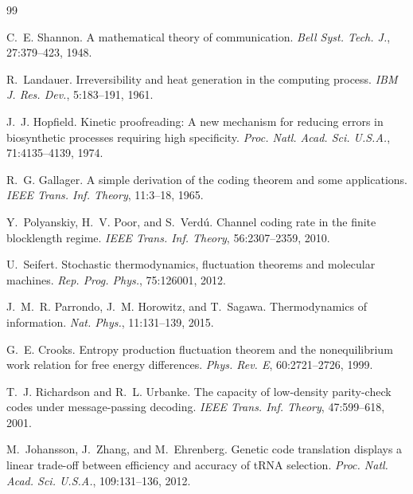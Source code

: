 \documentclass[11pt,twocolumn]{article}
\begin{document}
\begin{thebibliography}{99}

C.~E. Shannon.
\newblock A mathematical theory of communication.
\newblock \emph{Bell Syst. Tech. J.}, 27:379--423, 1948.

R.~Landauer.
\newblock Irreversibility and heat generation in the computing process.
\newblock \emph{IBM J. Res. Dev.}, 5:183--191, 1961.

J.~J. Hopfield.
\newblock Kinetic proofreading: A new mechanism for reducing errors in biosynthetic processes requiring high specificity.
\newblock \emph{Proc. Natl. Acad. Sci. U.S.A.}, 71:4135--4139, 1974.

R.~G. Gallager.
\newblock A simple derivation of the coding theorem and some applications.
\newblock \emph{IEEE Trans. Inf. Theory}, 11:3--18, 1965.

Y.~Polyanskiy, H.~V. Poor, and S.~Verd{\'u}.
\newblock Channel coding rate in the finite blocklength regime.
\newblock \emph{IEEE Trans. Inf. Theory}, 56:2307--2359, 2010.

U.~Seifert.
\newblock Stochastic thermodynamics, fluctuation theorems and molecular machines.
\newblock \emph{Rep. Prog. Phys.}, 75:126001, 2012.

J.~M.~R. Parrondo, J.~M. Horowitz, and T.~Sagawa.
\newblock Thermodynamics of information.
\newblock \emph{Nat. Phys.}, 11:131--139, 2015.

G.~E. Crooks.
\newblock Entropy production fluctuation theorem and the nonequilibrium work relation for free energy differences.
\newblock \emph{Phys. Rev. E}, 60:2721--2726, 1999.

T.~J. Richardson and R.~L. Urbanke.
\newblock The capacity of low-density parity-check codes under message-passing decoding.
\newblock \emph{IEEE Trans. Inf. Theory}, 47:599--618, 2001.

M.~Johansson, J.~Zhang, and M.~Ehrenberg.
\newblock Genetic code translation displays a linear trade-off between efficiency and accuracy of tRNA selection.
\newblock \emph{Proc. Natl. Acad. Sci. U.S.A.}, 109:131--136, 2012.


\end{thebibliography}
\end{document}
